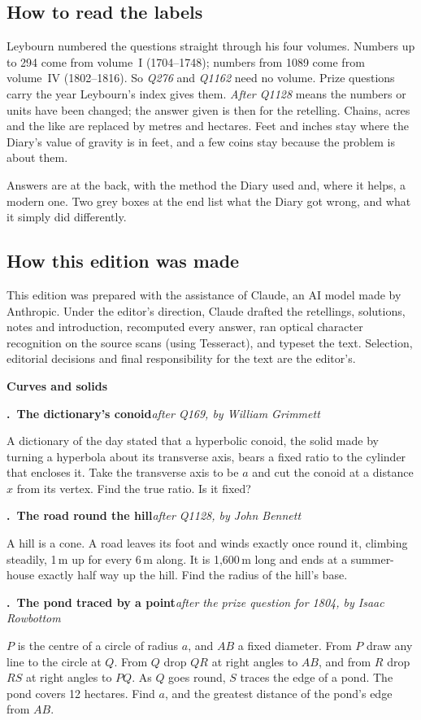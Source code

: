 \documentclass[11pt,a4paper]{article}
\newcounter{prob}
\newcommand{\prob}[3]{\par\bigskip\refstepcounter{prob}\label{#1}%
  \noindent\textbf{\theprob.\ #2}\hfill{\small\textit{#3}}\par\nopagebreak\smallskip}
\newcommand{\band}[3]{%
  \clearpage
  \begin{tcolorbox}[colback=#1!12,colframe=#1,boxrule=1pt,arc=2pt]
  {\Large\bfseries\color{#1} #2}\hfill{\large #3}
  \end{tcolorbox}}
\begin{document}
\subsection*{How to read the labels}

Leybourn numbered the questions straight through his four volumes. Numbers up to 294
come from volume~I (1704--1748); numbers from 1089 come from volume~IV (1802--1816). So
\textit{Q276} and \textit{Q1162} need no volume. Prize questions carry the year Leybourn's
index gives them. \textit{After Q1128} means the numbers or units have been changed; the
answer given is then for the retelling. Chains, acres and the like are replaced by metres
and hectares. Feet and inches stay where the Diary's value of gravity is in feet, and a
few coins stay because the problem is about them.

Answers are at the back, with the method the Diary used and, where it helps, a modern
one. Two grey boxes at the end list what the Diary got wrong, and what it simply did
differently.

\subsection*{How this edition was made}
This edition was prepared with the assistance of Claude, an AI model made by Anthropic. Under the editor's direction, Claude drafted the retellings, solutions, notes and introduction, recomputed every answer, ran optical character recognition on the source scans (using Tesseract), and typeset the text. Selection, editorial decisions and final responsibility for the text are the editor's.

\band{bandpurple}{Curves and solids}{}

\prob{c-conoid}{The dictionary's conoid}{after Q169, by William Grimmett}
A dictionary of the day stated that a hyperbolic conoid, the solid made by turning a
hyperbola about its transverse axis, bears a fixed ratio to the cylinder that encloses it.
Take the transverse axis to be $a$ and cut the conoid at a distance $x$ from its vertex.
Find the true ratio. Is it fixed?

\prob{c-road}{The road round the hill}{after Q1128, by John Bennett}
A hill is a cone. A road leaves its foot and winds exactly once round it, climbing
steadily, 1\,m up for every 6\,m along. It is 1,600\,m long and ends at a summer-house
exactly half way up the hill. Find the radius of the hill's base.

\prob{c-pond}{The pond traced by a point}{after the prize question for 1804, by Isaac Rowbottom}
$P$ is the centre of a circle of radius $a$, and $AB$ a fixed diameter. From $P$ draw any
line to the circle at $Q$. From $Q$ drop $QR$ at right angles to $AB$, and from $R$ drop
$RS$ at right angles to $PQ$. As $Q$ goes round, $S$ traces the edge of a pond. The pond
covers 12 hectares. Find $a$, and the greatest distance of the pond's edge from $AB$.
\end{document}
